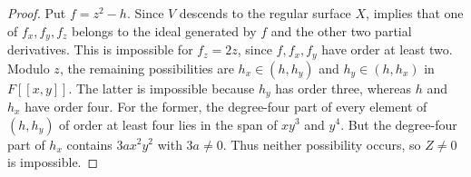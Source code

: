 \begin{proof}
Put $f = z^2-h$.
Since $V$ descends to the regular surface $X$, \cite[Corollary~5.4]{Sch08} implies that one of $f_x,f_y,f_z$ belongs to the ideal generated by $f$ and the other two partial derivatives.
This is impossible for $f_z = 2z$, since $f,f_x,f_y$ have order at least two.
Modulo $z$, the remaining possibilities are $h_x\in(h,h_y)$ and $h_y\in(h,h_x)$ in $F[[x,y]]$.
The latter is impossible because $h_y$ has order three, whereas $h$ and $h_x$ have order four.
For the former, the degree-four part of every element of $(h,h_y)$ of order at least four lies in the span of $xy^3$ and $y^4$.
But the degree-four part of $h_x$ contains $3ax^2y^2$ with $3a\neq 0$.
Thus neither possibility occurs, so $Z\neq 0$ is impossible.
\end{proof}
